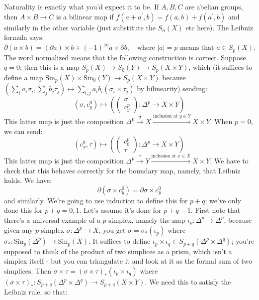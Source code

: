 \documentclass{amsart}
\theoremstyle{theorem}
\theoremstyle{definition}
\newcommand{\Sin}{\mathrm{Sin}}
\begin{document}
Naturality is exactly what you'd expect it to be. If $A,B,C$ are abelian groups, then $A\times B\to C$ is a bilinear map if $f(a+a^\prime,b)=f(a,b)+f(a^\prime,b)$ and similarly in the other variable (just substitute the $S_n(X)$ etc here). The Leibniz formula says:
		\begin{equation*}
		\partial(a\times b) = (\partial a)\times b + (-1)^{|a|}a\times\partial b,\quad\text{where }|a|=p\text{ means that }a\in S_p(X).
		\end{equation*}
The word normalized means that the following construction is correct. Suppose $q=0$; then this is a map $S_p(X)\to S_0(Y)\to S_p(X\times Y)$, which (it suffices to define a map $\Sin_p(X)\times \Sin_0(Y)\to S_p(X\times Y)$ because $\left(\sum_i a_i\sigma_i,\sum_j b_j\tau_j\right)\mapsto \sum_{i,j}a_ib_i(\sigma_i\times\tau_j)$ by bilinearity) sending:
		\begin{equation*}
		(\sigma, c^0_y)\mapsto \left(\begin{pmatrix}\sigma \\ c^p_y\end{pmatrix}:\Delta^p\to X\times Y\right)
		\end{equation*}
This latter map is just the composition $\Delta^p\xrightarrow{\sigma} X\xrightarrow{\text{inclusion at }y\in Y}X\times Y$. When $p=0$, we can send:
		\begin{equation*}
		(c^0_x,\tau)\mapsto \left(\begin{pmatrix}c^p_0 \\ \tau\end{pmatrix}:\Delta^p\to X\times Y\right)
		\end{equation*}
This latter map is just the composition $\Delta^p\xrightarrow{\tau} Y\xrightarrow{\text{inclusion at }x\in X}X\times Y$. We have to check that this behaves correctly for the boundary map, namely, that Leibniz holds. We have:
		\begin{equation*}
		\partial(\sigma\times c^0_y) = \partial\sigma\times c^0_y
		\end{equation*}
and similarly. We're going to use induction to define this for $p+q$; we've only done this for $p+q=0,1$. Let's assume it's done for $p+q-1$. First note that there's a universal example of a $p$-simplex, namely the map $\iota_p:\Delta^p\to \Delta^p$, because given any $p$-simplex $\sigma:\Delta^p\to X$, you get $\sigma=\sigma_\ast(\iota_p)$ where $\sigma_\ast:\Sin_p(\Delta^p)\to \Sin_p(X)$. It suffices to define $\iota_p\times\iota_q\in S_{p+q}(\Delta^p\times\Delta^q)$; you're supposed to think of the product of two simplices as a prism, which isn't a simplex itself - but you can triangulate it and look at it as the formal sum of two simplices. Then $\sigma\times \tau = (\sigma\times\tau)_\ast(\iota_p\times\iota_q)$ where $(\sigma\times\tau)_\ast:S_{p+q}(\Delta^p\times\Delta^q)\to S_{p+q}(X\times Y)$. We need this to satisfy the Leibniz rule, so that:
\end{document}
